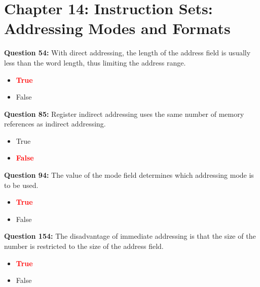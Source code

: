 \documentclass[12pt,a4paper]{article}
\begin{document}
\vspace{0.5cm}

\section{Chapter 14: Instruction Sets: Addressing Modes and Formats}

\textbf{Question 54:} With direct addressing, the length of the address field is usually less than the word length, thus limiting the address range.

\begin{itemize}
    \item[\textbf{A.}] \textcolor{red}{\textbf{True}}
    \item[\textbf{B.}] False
\end{itemize}

\vspace{0.5cm}

\textbf{Question 85:} Register indirect addressing uses the same number of memory references as indirect addressing.

\begin{itemize}
    \item[\textbf{A.}] True
    \item[\textbf{B.}] \textcolor{red}{\textbf{False}}
\end{itemize}

\vspace{0.5cm}

\textbf{Question 94:} The value of the mode field determines which addressing mode is to be used.

\begin{itemize}
    \item[\textbf{A.}] \textcolor{red}{\textbf{True}}
    \item[\textbf{B.}] False
\end{itemize}

\vspace{0.5cm}

\textbf{Question 154:} The disadvantage of immediate addressing is that the size of the number is restricted to the size of the address field.

\begin{itemize}
    \item[\textbf{A.}] \textcolor{red}{\textbf{True}}
    \item[\textbf{B.}] False
\end{itemize}

\vspace{0.5cm}
\end{document}
